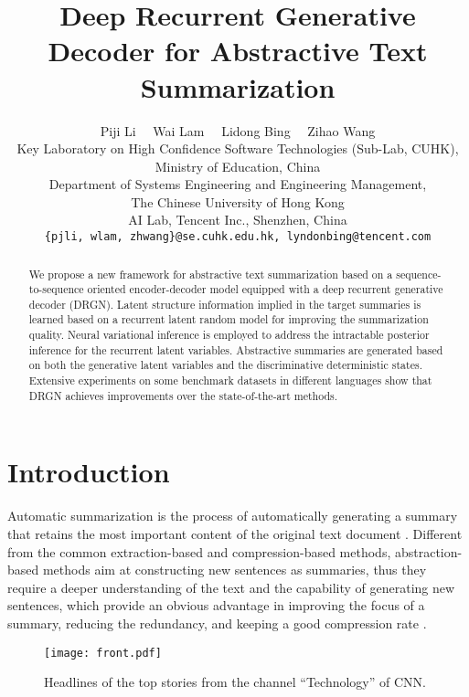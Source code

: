 \documentclass[11pt,letterpaper]{article}
\title{Deep Recurrent Generative Decoder for Abstractive Text Summarization\Thanks{The work described in this paper is supported by a grant from the Grant Council of the Hong Kong Special Administrative Region, China (Project Code: 14203414).}}
\author{ Piji Li \ \ Wai Lam \ \ Lidong Bing \ \ Zihao Wang \\
		Key Laboratory on High Confidence Software Technologies (Sub-Lab, CUHK), \\Ministry of Education, China\\
		Department of Systems Engineering and Engineering Management,\\
		The Chinese University of Hong Kong\\
		AI Lab, Tencent Inc., Shenzhen, China\\
		{\tt  \{pjli, wlam, zhwang\}@se.cuhk.edu.hk, lyndonbing@tencent.com}}
\date{}
\begin{document}
\maketitle

\begin{abstract}
  We propose a new framework for abstractive text summarization based on a sequence-to-sequence oriented encoder-decoder model equipped with a deep recurrent generative decoder (DRGN).
  Latent structure information implied in the target summaries is learned based on a recurrent latent random model for improving the summarization quality.
  Neural variational inference is employed to address the intractable posterior inference for the recurrent latent variables.
  Abstractive summaries are generated based on both the generative latent variables and the discriminative deterministic states.
  Extensive experiments on some benchmark datasets in different languages show that DRGN achieves improvements over the state-of-the-art methods.
\end{abstract}


\section{Introduction}
\label{sec:1}

Automatic summarization is the process of automatically generating a summary that retains the most important content of the original text document \cite{edmundson1969new,luhn1958automatic,nenkova2012survey}.
Different from the common extraction-based and compression-based methods, abstraction-based methods aim at constructing new sentences as summaries, thus they require a deeper understanding of the text and the capability of generating new sentences, which provide an obvious advantage in improving the focus of a summary, reducing the redundancy, and keeping a good compression rate \cite{lidong15absmds,rush2015neural,nallapati2016abstractive}.

\begin{figure}[!t]
	\centering
	\texttt{[image: front.pdf]}
	\caption{
		Headlines of the top stories from the channel ``Technology'' of CNN.
	}
	\label{fig:front}
\end{figure}
\end{document}
